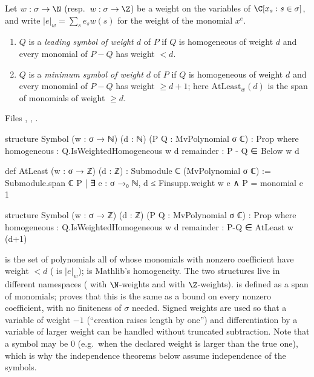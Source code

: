 \begin{definition}\label{l11:def:symbol}
Let $w:\sigma\to\N$ (resp.\ $w:\sigma\to\Z$) be a weight on the variables of $\C[x_s : s\in\sigma]$, and write
$|e|_w = \sum_se_sw(s)$ for the weight of the monomial $x^e$.
\begin{enumerate}
\item $Q$ is a \emph{leading symbol of weight $d$} of $P$ if $Q$ is homogeneous of weight $d$ and every monomial
  of $P-Q$ has weight $<d$.
\item $Q$ is a \emph{minimum symbol of weight $d$} of $P$ if $Q$ is homogeneous of weight $d$ and every monomial
  of $P-Q$ has weight $\ge d+1$; here $\mathrm{AtLeast}_w(d)$ is the span of monomials of weight $\ge d$.
\end{enumerate}
\end{definition}
\noindent Files ,
,
.
\begin{leancode}
structure Symbol (w : σ → ℕ) (d : ℕ) (P Q : MvPolynomial σ ℂ) : Prop where
  homogeneous : Q.IsWeightedHomogeneous w d
  remainder : P - Q ∈ Below w d

def AtLeast (w : σ → ℤ) (d : ℤ) : Submodule ℂ (MvPolynomial σ ℂ) :=
  Submodule.span ℂ {P | ∃ e : σ →₀ ℕ, d ≤ Finsupp.weight w e ∧ P = monomial e 1}

structure Symbol (w : σ → ℤ) (d : ℤ) (P Q : MvPolynomial σ ℂ) : Prop where
  homogeneous : Q.IsWeightedHomogeneous w d
  remainder : P-Q ∈ AtLeast w (d+1)
\end{leancode}

\begin{dictionary}
 is the set of polynomials all of whose monomials with nonzero coefficient have weight $<d$
( is $|e|_w$);  is Mathlib's homogeneity. The two 
structures live in different namespaces ( with $\N$-weights and
 with $\Z$-weights).  is defined as a span of monomials;
 proves that this is the same as a bound on every nonzero coefficient, with no finiteness of
$\sigma$ needed. Signed weights are used so that a variable of weight $-1$ (``creation raises length by one'')
and differentiation by a variable of larger weight can be handled without truncated subtraction. Note that a
symbol may be $0$ (e.g.\ when the declared weight is larger than the true one), which is why the independence
theorems below assume independence of the symbols.
\end{dictionary}

